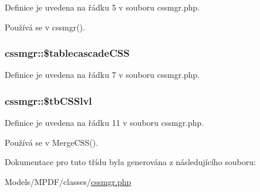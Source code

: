 Definice je uvedena na řádku 5 v souboru cssmgr.\-php.



Používá se v cssmgr().

\hypertarget{classcssmgr_ae9c894771b7d9a689361f360249d65a4}{
\subsubsection[{\$tablecascade\-C\-S\-S}]{\setlength{\rightskip}{0pt plus 5cm}cssmgr\-::\$tablecascade\-C\-S\-S}}\label{classcssmgr_ae9c894771b7d9a689361f360249d65a4}


Definice je uvedena na řádku 7 v souboru cssmgr.\-php.

\hypertarget{classcssmgr_a9a668bca9b55589214c18aa371e449e9}{
\subsubsection[{\$tb\-C\-S\-Slvl}]{\setlength{\rightskip}{0pt plus 5cm}cssmgr\-::\$tb\-C\-S\-Slvl}}\label{classcssmgr_a9a668bca9b55589214c18aa371e449e9}


Definice je uvedena na řádku 11 v souboru cssmgr.\-php.



Používá se v Merge\-C\-S\-S().



Dokumentace pro tuto třídu byla generována z následujícího souboru\-:\begin{DoxyCompactItemize}
\item 
Models/\-M\-P\-D\-F/classes/\hyperlink{cssmgr_8php}{cssmgr.\-php}\end{DoxyCompactItemize}
